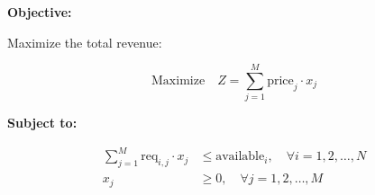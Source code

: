 \documentclass{article}
\begin{document}
\textbf{Objective:}

Maximize the total revenue:

\[
\text{Maximize} \quad Z = \sum_{j=1}^{M} \text{price}_j \cdot x_j
\]

\textbf{Subject to:}

\begin{align*}
\sum_{j=1}^{M} \text{req}_{i,j} \cdot x_j & \leq \text{available}_i, \quad \forall i = 1, 2, \ldots, N \\
x_j & \geq 0, \quad \forall j = 1, 2, \ldots, M
\end{align*}
\end{document}
